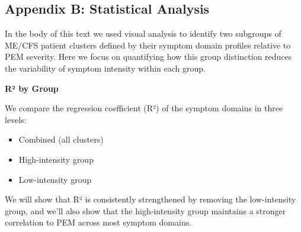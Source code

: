 \documentclass[
  letterpaper,
  DIV=11,
  numbers=noendperiod]{scrartcl}
\providecommand{\tightlist}{%
  \setlength{\itemsep}{0pt}\setlength{\parskip}{0pt}}
\begin{document}
\FloatBarrier
\clearpage

\subsection*{Appendix B: Statistical Analysis}\label{sec-regression}

In the body of this text we used visual analysis to identify two
subgroups of ME/CFS patient clusters defined by their symptom domain
profiles relative to PEM severity. Here we focus on quantifying how this
group distinction reduces the variability of symptom intensity within
each group.

\bigskip

\textbf{R² by Group}

We compare the regression coefficient (R²) of the symptom domains in
three levels:

\begin{itemize}
\tightlist
\item
  Combined (all clusters)
\item
  High-intensity group
\item
  Low-intensity group
\end{itemize}

We will show that R² is consistently strengthened by removing the
low-intensity group, and we'll also show that the high-intensity group
maintains a stronger correlation to PEM across most symptom domains.
\FloatBarrier

\begin{table}[h]

\caption{\label{tbl-t2}R² by Domain}


\end{table}%
\end{document}
